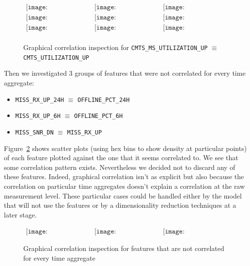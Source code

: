 \begin{figure}[h]
\begin{center}$
\begin{array}{ccc}
\texttt{[image: correlation-1]} &
\texttt{[image: correlation-2]} &
\texttt{[image: correlation-3]}\\
\texttt{[image: correlation-4]} &
\texttt{[image: correlation-5]} &
\texttt{[image: correlation-6]}\\
\texttt{[image: correlation-7]} &
\texttt{[image: correlation-8]} &
\texttt{[image: correlation-9]}\\
\end{array}$
\end{center}
\caption{\label{correlation_insp}Graphical correlation inspection for \texttt{CMTS\_MS\_UTILIZATION\_UP} $\equiv$ \texttt{CMTS\_UTILIZATION\_UP}}
\end{figure}

Then we investigated 3 groups of features that were not correlated for every time aggregate:
\begin{itemize}[noitemsep,topsep=0pt]
	\item \texttt{MISS\_RX\_UP\_24H} $\equiv$ \texttt{OFFLINE\_PCT\_24H}
	\item \texttt{MISS\_RX\_UP\_6H}  $\equiv$ \texttt{OFFLINE\_PCT\_6H}
	\item \texttt{MISS\_SNR\_DN}  $\equiv$ \texttt{MISS\_RX\_UP}
\end{itemize}
Figure~\ref{almost_correlation_insp} shows scatter plots (using hex bins to show density at particular points) of each feature plotted against the one that it seems correlated to. We see that some correlation pattern exists. Nevertheless we decided not to discard any of these features. Indeed, graphical correlation isn't as explicit but also because the correlation on particular time aggregates doesn't explain a correlation at the raw measurement level. These particular cases could be handled either by the model that will not use the features or by a dimensionality reduction techniques at a later stage.

\begin{figure}[h]
\begin{center}$
\begin{array}{ccc}
\texttt{[image: almost\_corr\_1]} &
\texttt{[image: almost\_corr\_2]} &
\texttt{[image: almost\_corr\_3]}
\end{array}$
\end{center}
\caption{\label{almost_correlation_insp} Graphical correlation inspection for features that are not correlated for every time aggregate}
\end{figure}

